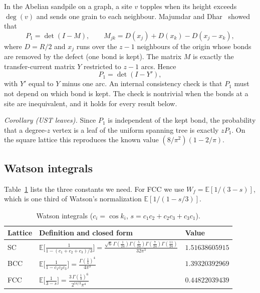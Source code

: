 \documentclass[aps,pre,10pt,twocolumn,superscriptaddress,nofootinbib]{revtex4-2}
\newcommand{\E}{\mathbb{E}}
\begin{document}
In the Abelian sandpile on a graph, a site $v$ topples when its height exceeds $\deg(v)$ and
sends one grain to each neighbour. Majumdar and Dhar~\cite{MajumdarDhar1991} showed that
\begin{equation}
P_1=\det(I-M),\qquad M_{jk}=D(x_j)+D(x_k)-D(x_j-x_k),
\label{eq:md}
\end{equation}
where $D=R/2$ and $x_j$ runs over the $z-1$ neighbours of the origin whose bonds are removed
by the defect (one bond is kept). The matrix $M$ is exactly the transfer-current matrix $Y$
restricted to $z-1$ arcs. Hence
\begin{equation}
P_1=\det(I-Y'),
\label{eq:md-Y}
\end{equation}
with $Y'$ equal to $Y$ minus one arc. An internal consistency check is that $P_1$ must not depend on which
bond is kept. The check is nontrivial when the bonds at a site are inequivalent, and it holds for every result below.

\emph{Corollary (UST leaves).} Since $P_1$ is independent of the kept bond, the probability that a
degree-$z$ vertex is a leaf of the uniform spanning tree is exactly $zP_1$. On the square lattice this
reproduces the known value $(8/\pi^2)(1-2/\pi)$.

\subsection{Watson integrals}

Table~\ref{tab:watson} lists the three constants we need. For FCC we use
$W_f=\E[1/(3-s)]$, which is one third of Watson's normalization $\E[1/(1-s/3)]$.

\begin{table}
\caption{Watson integrals ($c_i=\cos k_i$, $s=c_1c_2+c_2c_3+c_3c_1$).}
\label{tab:watson}
\begin{ruledtabular}
\begin{tabular}{lll}
Lattice & Definition and closed form & Value\\
\hline
SC & $\E\bigl[\tfrac{1}{1-(c_1+c_2+c_3)/3}\bigr]=\tfrac{\sqrt6\,\Gamma(\frac1{24})\Gamma(\frac5{24})\Gamma(\frac7{24})\Gamma(\frac{11}{24})}{32\pi^3}$ & $1.51638605915$\\
BCC & $\E\bigl[\tfrac{1}{1-c_1c_2c_3}\bigr]=\tfrac{\Gamma(\frac14)^4}{4\pi^3}$ & $1.39320392969$\\
FCC & $\E\bigl[\tfrac{1}{3-s}\bigr]=\tfrac{3\,\Gamma(\frac13)^6}{2^{14/3}\pi^4}$ & $0.44822039439$\\
\end{tabular}
\end{ruledtabular}
\end{table}
\end{document}
